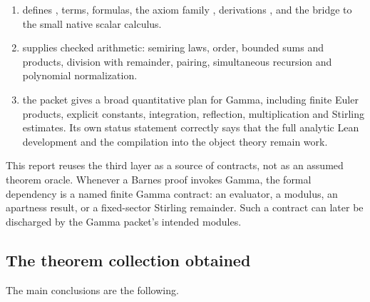 \begin{enumerate}
\item {} defines , terms, formulas, the axiom family
, derivations , and the bridge  to
the small native scalar calculus.
\item {} supplies checked arithmetic: semiring laws,
order, bounded sums and products, division with remainder, pairing,
simultaneous recursion and polynomial normalization.
\item the  packet gives a broad quantitative plan for Gamma,
including finite Euler products, explicit constants, integration, reflection,
multiplication and Stirling estimates.  Its own status statement correctly says
that the full analytic Lean development and the compilation into the object
theory remain work.
\end{enumerate}

This report reuses the third layer as a source of contracts, not as an assumed
theorem oracle.  Whenever a Barnes proof invokes Gamma, the formal dependency
is a named finite Gamma contract: an evaluator, a modulus, an apartness result,
or a fixed-sector Stirling remainder.  Such a contract can later be discharged
by the Gamma packet's intended modules.

\subsection{The theorem collection obtained}

The main conclusions are the following.

